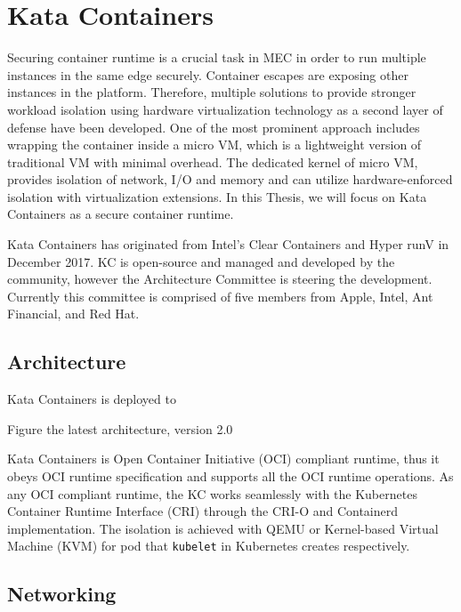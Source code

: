 \chapter{Kata Containers}
\label{chapter:katacontainers}

Securing container runtime is a crucial task in MEC in order to run multiple instances in the same edge securely. Container escapes are exposing other instances in the platform. Therefore, multiple solutions to provide stronger workload isolation using hardware virtualization technology as a second layer of defense have been developed. One of the most prominent approach includes wrapping the container inside a micro VM, which is a lightweight version of traditional VM with minimal overhead. The dedicated kernel of micro VM, provides isolation of network, I/O and memory and can utilize hardware-enforced isolation with virtualization extensions. In this Thesis, we will focus on Kata Containers as a secure container runtime. \cite{KataContainers}

Kata Containers has originated from Intel's Clear Containers\cite{ClearContainers} and Hyper runV\cite{runV} in December 2017. KC is open-source and managed and developed by the community, however the Architecture Committee is steering the development. Currently this committee is comprised of five members from Apple, Intel, Ant Financial, and Red Hat. \cite{KataContainersGovernance}

\section{Architecture}

Kata Containers is deployed to 

Figure the latest architecture, version 2.0



Kata Containers is Open Container Initiative (OCI) compliant runtime, thus it obeys OCI runtime specification and supports all the OCI runtime operations. As any OCI compliant runtime, the KC works seamlessly with the Kubernetes Container Runtime Interface (CRI) through the CRI-O and Containerd implementation. The isolation is achieved with QEMU\cite{QEMU} or Kernel-based Virtual Machine (KVM)\cite{KVM} for pod that \texttt{kubelet} in Kubernetes creates respectively.

\section{Networking}

